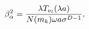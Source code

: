 \begin{equation}
\beta _{\alpha }^{2}=\frac{\lambda T_{\nu _{l} }(\lambda a)}{%
N(m_{k})\omega a\sigma ^{D-1}},  \label{normcoef}
\end{equation}

